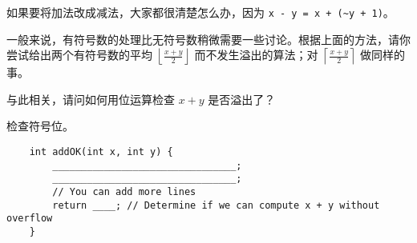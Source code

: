 \begin{example}[加法器与减法器]
        如果要将加法改成减法，大家都很清楚怎么办，因为 \verb|x - y = x + (~y + 1)|。

        一般来说，有符号数的处理比无符号数稍微需要一些讨论。根据上面的方法，请你尝试给出两个有符号数的平均 $\left \lfloor \frac{x+y}{2} \right \rfloor$ 而不发生溢出的算法；对 $\left \lceil \frac{x+y}{2} \right \rceil$ 做同样的事。
        
        与此相关，请问如何用位运算检查 $x+y$ 是否溢出了？\begin{hint} 检查符号位。 \end{hint}
        \begin{verbatim}
    int addOK(int x, int y) {
        ________________________________;
        ________________________________;
        // You can add more lines
        return ____; // Determine if we can compute x + y without overflow
    }
        \end{verbatim}
    \end{example}

